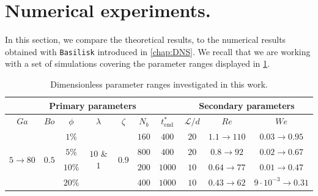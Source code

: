 \section{Numerical experiments. }

In this section, we compare the theoretical results, to the numerical results obtained with \texttt{Basilisk} introduced in \ref{chap:DNS}. 
We recall that we are working with a set of simulations covering the parameter ranges displayed in \ref{tab:simulations_recall}. 
\begin{table}[h!]
    \centering
    \caption{Dimensionless parameter ranges investigated in this work.}
    \begin{tabular}{|ccccccc|ccc|}
        \hline
        \multicolumn{7}{|c}{Primary parameters} & \multicolumn{3}{||c|}{Secondary parameters}\\ \hline
        \multicolumn{1}{|c|}{$Ga$}                               & \multicolumn{1}{c|}{$Bo$}                   & \multicolumn{1}{c|}{$\phi$} & \multicolumn{1}{c|}{$\lambda$}                    & \multicolumn{1}{c|}{$\zeta$}                & \multicolumn{1}{c|}{$N_b$} & $t^*_\text{end}$ & \multicolumn{1}{||c|}{$\mathcal{L}/d$} & \multicolumn{1}{c|}{$Re$}  & $We$   \\ \hline
        \multicolumn{1}{|c|}{\multirow{4}{*}{$5\rightarrow 80$}} & \multicolumn{1}{c|}{\multirow{4}{*}{$0.5$}} & \multicolumn{1}{c|}{$1\%$}  & \multicolumn{1}{c|}{\multirow{4}{*}{$10$ \& $1$}} & \multicolumn{1}{c|}{\multirow{4}{*}{$0.9$}} & \multicolumn{1}{c|}{$160$} & $400$           & \multicolumn{1}{||c|}{$20$}            & \multicolumn{1}{c|}{$1.1\to 110$} & {$0.03\to 0.95$} \\ 
        \multicolumn{1}{|c|}{}                                   & \multicolumn{1}{c|}{}                       & \multicolumn{1}{c|}{$5\%$}  & \multicolumn{1}{c|}{}                             & \multicolumn{1}{c|}{}                       & \multicolumn{1}{c|}{$800$} & $400$           & \multicolumn{1}{||c|}{$20$}            & \multicolumn{1}{c|}{$0.8\to 92$} &  {$0.02\to 0.67$}\\ 
        \multicolumn{1}{|c|}{}                                   & \multicolumn{1}{c|}{}                       & \multicolumn{1}{c|}{$10\%$} & \multicolumn{1}{c|}{}                             & \multicolumn{1}{c|}{}                       & \multicolumn{1}{c|}{$200$} & $1000$           & \multicolumn{1}{||c|}{$10$}            & \multicolumn{1}{c|}{$0.64\to 77$}&  {$0.01\to 0.47$}\\ 
        \multicolumn{1}{|c|}{}                                   & \multicolumn{1}{c|}{}                       & \multicolumn{1}{c|}{$20\%$} & \multicolumn{1}{c|}{}                             & \multicolumn{1}{c|}{}                       & \multicolumn{1}{c|}{$400$} & $1000$           & \multicolumn{1}{||c|}{$10$}            & \multicolumn{1}{c|}{$0.43\to 62$}&  {$9\cdot 10^{-3}\to 0.31$}\\ \hline
        \end{tabular}
    \label{tab:simulations_recall}
\end{table}
